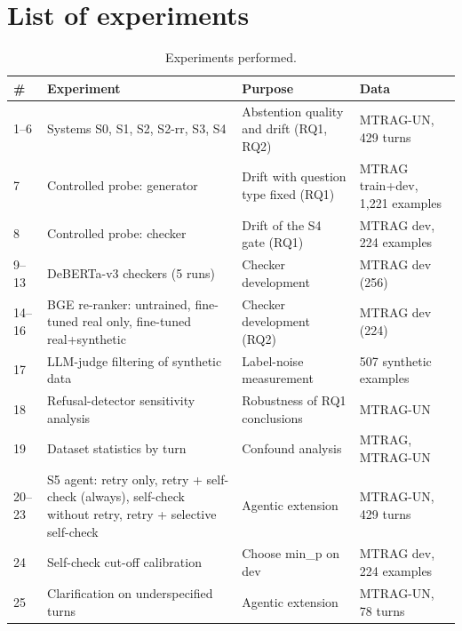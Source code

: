 \documentclass[11pt,a4paper]{report}
\newcommand{\sys}[1]{\textsf{#1}}
\begin{document}
\section{List of experiments}
\begin{table}[H]
\centering\small
\begin{tabularx}{\textwidth}{@{}p{1.0cm}p{4.6cm}Yp{3.4cm}@{}}
\toprule
\# & Experiment & Purpose & Data \\
--6 & Systems \sys{S0}, \sys{S1}, \sys{S2}, \sys{S2-rr}, \sys{S3}, \sys{S4} & Abstention quality and drift (RQ1, RQ2) & MTRAG-UN, 429 turns \\
7 & Controlled probe: generator & Drift with question type fixed (RQ1) & MTRAG train+dev, 1{,}221 examples \\
8 & Controlled probe: checker & Drift of the \sys{S4} gate (RQ1) & MTRAG dev, 224 examples \\
9--13 & DeBERTa-v3 checkers (5 runs) & Checker development & MTRAG dev (256) \\
14--16 & BGE re-ranker: untrained, fine-tuned real only, fine-tuned real+synthetic & Checker development (RQ2) & MTRAG dev (224) \\
17 & LLM-judge filtering of synthetic data & Label-noise measurement & 507 synthetic examples \\
18 & Refusal-detector sensitivity analysis & Robustness of RQ1 conclusions & MTRAG-UN \\
19 & Dataset statistics by turn & Confound analysis & MTRAG, MTRAG-UN \\
20--23 & S5 agent: retry only, retry + self-check (always), self-check without retry, retry + selective self-check & Agentic extension & MTRAG-UN, 429 turns \\
24 & Self-check cut-off calibration & Choose min\_p on dev & MTRAG dev, 224 examples \\
25 & Clarification on underspecified turns & Agentic extension & MTRAG-UN, 78 turns \\
\bottomrule
\end{tabularx}
\caption{Experiments performed.}
\label{tab:exps}
\end{table}
\end{document}
